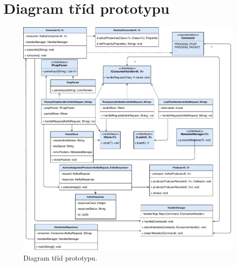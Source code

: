 \chapter{Diagram tříd prototypu}

\begin{figure}[!h]
    \centering
    \includegraphics[width=14.35cm]{template-fig/Prototype_ClassDiagram.pdf}
    \caption{Diagram tříd prototypu.}
    \label{FIG_PrototypeClassDiagram}
\end{figure}
